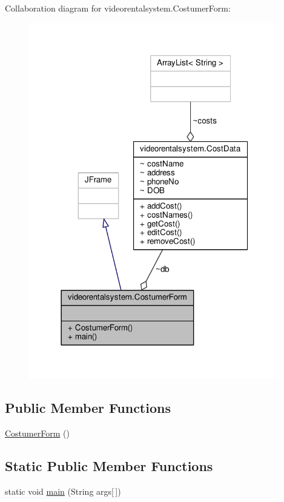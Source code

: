 Collaboration diagram for videorentalsystem.\-Costumer\-Form\-:
\nopagebreak
\begin{figure}[H]
\begin{center}
\leavevmode
\includegraphics[width=310pt]{classvideorentalsystem_1_1CostumerForm__coll__graph}
\end{center}
\end{figure}
\subsection*{Public Member Functions}
\begin{DoxyCompactItemize}
\item 
\hyperlink{classvideorentalsystem_1_1CostumerForm_aaefba6f9c8bca137b4a806afdd5d2dc3}{Costumer\-Form} ()
\end{DoxyCompactItemize}
\subsection*{Static Public Member Functions}
\begin{DoxyCompactItemize}
\item 
static void \hyperlink{classvideorentalsystem_1_1CostumerForm_a6553f7bdd5d2becfabe09d9d5fc3f8e2}{main} (String args\mbox{[}$\,$\mbox{]})
\end{DoxyCompactItemize}


